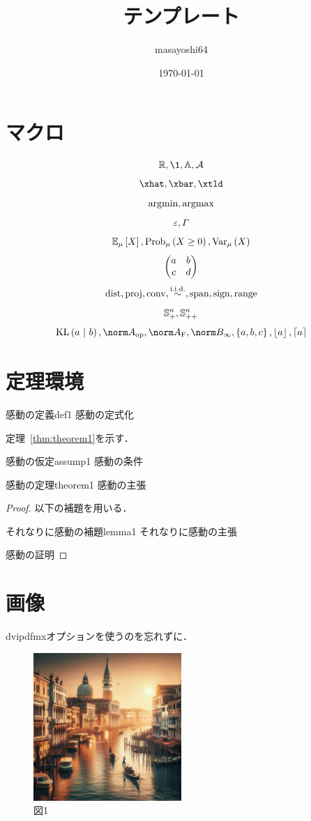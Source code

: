 \documentclass[11pt,a4paper, dvipdfmx]{article}
\title{テンプレート}
\author{masayoshi64}
\date{\today}
\begin{document}
\maketitle

\section{マクロ}
\[\R, \1, \Abb, \cA\]
\[\xhat, \xbar, \xtld\]
\[\operatorname*{argmin}, \operatorname*{argmax}\]
\[\varepsilon, \varGamma\]
\[\Expec[\mu]{X}, \Prob[\mu]{X \geq 0}, \Var[\mu]{X}\]
\[\begin{pmatrix} 
        a & b                \\
        c & d
     \end{pmatrix}\]
\[\mathrm{dist}, \mathrm{proj}, \mathrm{conv}, \overset{\mathrm{i.i.d.}}{\sim}, \mathrm{span}, \mathrm{sign}, \mathrm{range} \]
\[\mathbb{S}^{n}_+, \mathbb{S}^{n}_{++}\]
\[\kl{a}{b}, \opnorm{A}, \frobnorm{A}, \infnorm{B}, \set{a, b, c}, \floor{a}, \ceil{a}\]

\section{定理環境}
\begin{definition}{感動の定義}{def1}
    感動の定式化
\end{definition}
定理~\ref{thm:theorem1}を示す．
\begin{assumption}{感動の仮定}{assump1}
    感動の条件
\end{assumption}
\begin{theorem}{感動の定理}{theorem1}
    感動の主張
\end{theorem}
\begin{proof}
    以下の補題を用いる．
    \begin{lemma}{それなりに感動の補題}{lemma1}
        それなりに感動の主張
    \end{lemma}
    感動の証明
\end{proof}

\section{画像}
dvipdfmxオプションを使うのを忘れずに．
\begin{figure}[htbp]
    \centering
    \includegraphics[width=0.5\textwidth]{figs/test.png}
    \caption{図1}
    \label{fig:fig1}
\end{figure}
\end{document}

